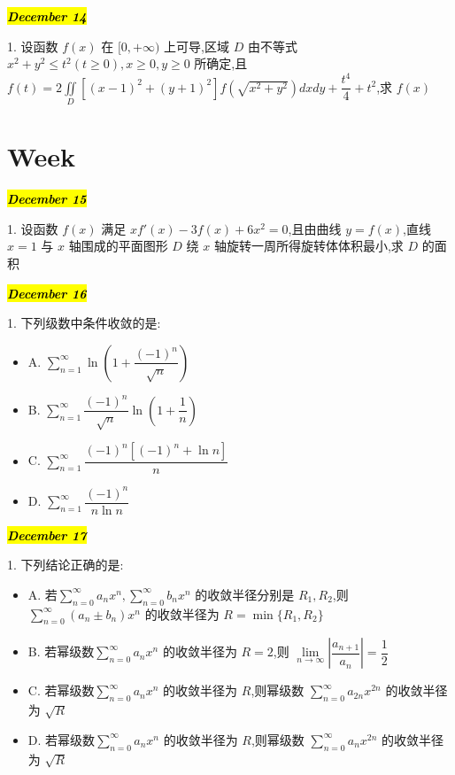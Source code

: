 \hl{\textbf{\textit{December 14}}}

1. 设函数 $f(x)$ 在 $[0,+\infty)$ 上可导,区域 $D$ 由不等式 $x^{2}+y^{2}\leq t^{2}(t\geq 0),x\geq 0,y\geq 0$ 所确定,且 $f(t)=2\iint\limits_{D}[(x-1)^{2}+(y+1)^{2}]f(\sqrt{x^{2}+y^{2}})dxdy+\dfrac{t^{4}}{4}+t^{2}$,求 $f(x)$
\begin{solution}
	
\end{solution}

\section{Week }
\hl{\textbf{\textit{December 15}}}

1. 设函数 $f(x)$ 满足 $xf'(x)-3f(x)+6x^{2}=0$,且由曲线 $y=f(x)$,直线 $x=1$ 与 $x$ 轴围成的平面图形 $D$ 绕 $x$ 轴旋转一周所得旋转体体积最小,求 $D$ 的面积
\begin{solution}
	
\end{solution}

\hl{\textbf{\textit{December 16}}}

1. 下列级数中条件收敛的是:
\begin{itemize}
	\item A. $\sum\limits_{n=1}^{\infty}\ln(1+\dfrac{(-1)^{n}}{\sqrt{n}})$
	\item B. $\sum\limits_{n=1}^{\infty}\dfrac{(-1)^{n}}{\sqrt{n}}\ln(1+\dfrac{1}{n})$
	\item C. $\sum\limits_{n=1}^{\infty}\dfrac{(-1)^{n}[(-1)^{n}+\ln n]}{n}$
	\item D. $\sum\limits_{n=1}^{\infty}\dfrac{(-1)^{n}}{n\ln n}$
\end{itemize}
\begin{solution}
	
\end{solution}

\hl{\textbf{\textit{December 17}}}

1. 下列结论正确的是:
\begin{itemize}
	\item A. 若$\sum\limits_{n=0}^{\infty}a_{n}x^{n},\sum\limits_{n=0}^{\infty}b_{n}x^{n}$ 的收敛半径分别是 $R_{1},R_{2}$,则 $\sum\limits_{n=0}^{\infty}(a_{n}\pm b_{n})x^{n}$ 的收敛半径为 $R=\min\{R_{1},R_{2}\}$
	\item B. 若幂级数$\sum\limits_{n=0}^{\infty}a_{n}x^{n}$ 的收敛半径为 $R=2$,则 $\lim\limits_{n\to\infty}|\dfrac{a_{n+1}}{a_{n}}|=\dfrac{1}{2}$
	\item C. 若幂级数$\sum\limits_{n=0}^{\infty}a_{n}x^{n}$ 的收敛半径为 $R$,则幂级数 $\sum\limits_{n=0}^{\infty}a_{2n}x^{2n}$ 的收敛半径为 $\sqrt{R}$
	\item D. 若幂级数$\sum\limits_{n=0}^{\infty}a_{n}x^{n}$ 的收敛半径为 $R$,则幂级数 $\sum\limits_{n=0}^{\infty}a_{n}x^{2n}$ 的收敛半径为 $\sqrt{R}$
\end{itemize}
\begin{solution}
	
\end{solution}

